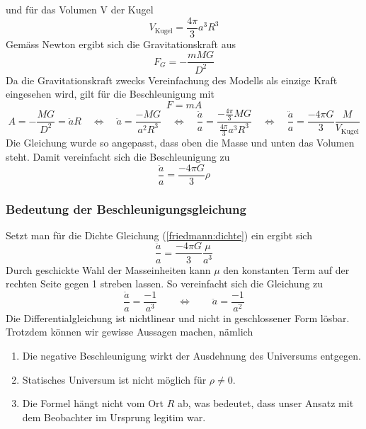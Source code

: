 \begin{refsection}
und für das Volumen V der Kugel
\[V_\text{Kugel} = \frac{4 \pi }{3} a^3 R^3\]
Gemäss Newton ergibt sich die Gravitationskraft aus
\begin{equation}
F_G = -\frac{m M G}{D^2}
\end{equation}
Da die Gravitationskraft zwecks Vereinfachung des Modells als einzige Kraft eingesehen wird, gilt für die Beschleunigung mit 
\[F = m A\]
\[A = - \frac{M G}{D^2} = \ddot{a} R \quad\Leftrightarrow\quad \ddot{a} = \frac{- M G}{a^2 R^3} \quad\Leftrightarrow\quad \frac{\ddot{a}}{a} = \frac{-\frac{4 \pi }{3} M G}{\frac{4 \pi}{3}a^3 R^3} \quad\Leftrightarrow\quad \frac{\ddot{a}}{a} = \frac{- 4 \pi G}{3} \frac{M}{V_\text{Kugel}}\]
Die Gleichung wurde so angepasst, dass oben die Masse und unten das Volumen steht. Damit vereinfacht sich die Beschleunigung zu
\begin{equation}
\frac{\ddot{a}}{a} = \frac{- 4 \pi G}{3} \rho
\end{equation}
\subsubsection{Bedeutung der Beschleunigungsgleichung}
Setzt man für die Dichte Gleichung (\ref{friedmann:dichte}) ein ergibt sich
\[\frac{\ddot{a}}{a} = \frac{- 4 \pi G}{3} \frac{\mu}{a^3} \]
Durch geschickte Wahl der Masseinheiten kann $\mu$ den konstanten Term auf der rechten Seite gegen 1 streben lassen. So vereinfacht sich die Gleichung zu
\[\frac{\ddot{a}}{a} = \frac{-1}{a^3} \qquad\Leftrightarrow\qquad \ddot{a} = \frac{-1}{a^2}\]
Die Differentialgleichung ist nichtlinear und nicht in geschlossener Form lösbar. Trotzdem können wir gewisse Aussagen machen, nämlich
\begin{enumerate}
	\item Die negative Beschleunigung wirkt der Ausdehnung des Universums entgegen. 
	\item Statisches Universum ist nicht möglich für $\rho \neq 0$.
	\item Die Formel hängt nicht vom Ort $R$ ab, was bedeutet, dass unser Ansatz mit dem Beobachter im Ursprung legitim war.
\end{enumerate}


\end{refsection}
